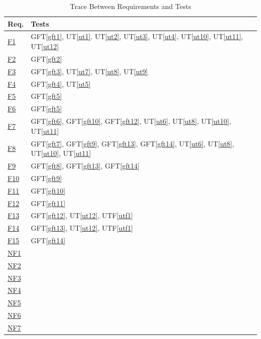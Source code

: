 \documentclass[12pt, titlepage]{article}
\begin{document}
\begin{table}[H]
\centering
\begin{tabular}{p{} p{}}
\toprule
\textbf{Req.} & \textbf{Tests}\\
\midrule
\href{../SRS/SRS.pdf#f1}{F1} & GFT\ref{gft1}, UT\ref{ut1}. UT\ref{ut2}, UT\ref{ut3}, UT\ref{ut4}, UT\ref{ut10}, UT\ref{ut11}, UT\ref{ut12}\\
\href{../SRS/SRS.pdf#f2}{F2} & GFT\ref{gft2}\\
\href{../SRS/SRS.pdf#f3}{F3} & GFT\ref{gft3}, UT\ref{ut7}, UT\ref{ut8}, UT\ref{ut9}\\
\href{../SRS/SRS.pdf#f4}{F4} & GFT\ref{gft4}, UT\ref{ut5}\\
\href{../SRS/SRS.pdf#f5}{F5} & GFT\ref{gft5}\\
\href{../SRS/SRS.pdf#f6}{F6} & GFT\ref{gft5}\\
\href{../SRS/SRS.pdf#f7}{F7} & GFT\ref{gft6}, GFT\ref{gft10}, GFT\ref{gft12}, UT\ref{ut6}, UT\ref{ut8}, UT\ref{ut10}, UT\ref{ut11}\\
\href{../SRS/SRS.pdf#f8}{F8} & GFT\ref{gft7}, GFT\ref{gft9}, GFT\ref{gft13}, GFT\ref{gft14}, UT\ref{ut6}, UT\ref{ut8}, UT\ref{ut10}, UT\ref{ut11}\\
\href{../SRS/SRS.pdf#f9}{F9} & GFT\ref{gft8}, GFT\ref{gft13}, GFT\ref{gft14}\\
\href{../SRS/SRS.pdf#f10}{F10} & GFT\ref{gft9}\\
\href{../SRS/SRS.pdf#f11}{F11} & GFT\ref{gft10}\\
\href{../SRS/SRS.pdf#f12}{F12} & GFT\ref{gft11}\\
\href{../SRS/SRS.pdf#f13}{F13} & GFT\ref{gft12}, UT\ref{ut12}, UTF\ref{utf1}\\
\href{../SRS/SRS.pdf#f14}{F14} & GFT\ref{gft13}, UT\ref{ut12}, UTF\ref{utf1}\\
\href{../SRS/SRS.pdf#f15}{F15} & GFT\ref{gft14}\\
\href{../SRS/SRS.pdf#nf1}{NF1} & \\
\href{../SRS/SRS.pdf#nf2}{NF2} & \\
\href{../SRS/SRS.pdf#nf3}{NF3} & \\
\href{../SRS/SRS.pdf#nf4}{NF4} & \\
\href{../SRS/SRS.pdf#nf5}{NF5} & \\
\href{../SRS/SRS.pdf#nf6}{NF6} & \\
\href{../SRS/SRS.pdf#nf7}{NF7} & \\
\bottomrule
\end{tabular}
\caption{Trace Between Requirements and Tests}
\label{TblRT}
\end{table}
		
\end{document}
